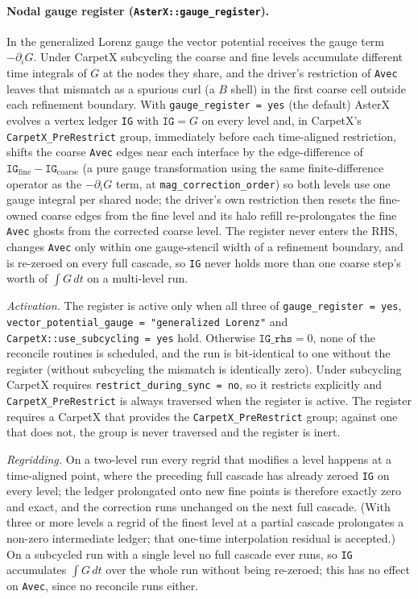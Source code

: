 \paragraph{Nodal gauge register (\texttt{AsterX::gauge\_register}).}
In the generalized Lorenz gauge the vector potential receives the gauge term
$-\partial_i G$. Under CarpetX subcycling the coarse and fine levels
accumulate different time integrals of $G$ at the nodes they share, and the
driver's restriction of \texttt{Avec} leaves that mismatch as a spurious curl
(a $B$ shell) in the first coarse cell outside each refinement boundary. With
\texttt{gauge\_register = yes} (the default) AsterX evolves a vertex ledger
\texttt{IG} with $\dot{\texttt{IG}} = G$ on every level and, in CarpetX's
\texttt{CarpetX\_PreRestrict} group, immediately before each time-aligned
restriction, shifts the coarse \texttt{Avec} edges near each interface by the
edge-difference of $\texttt{IG}_\mathrm{fine} - \texttt{IG}_\mathrm{coarse}$
(a pure gauge transformation using the same finite-difference operator as the
$-\partial_i G$ term, at \texttt{mag\_correction\_order}) so both levels use
one gauge integral per shared node; the driver's own restriction then resets
the fine-owned coarse edges from the fine level and its halo refill
re-prolongates the fine \texttt{Avec} ghosts from the corrected coarse level.
The register never enters the RHS,
changes \texttt{Avec} only within one gauge-stencil width of a refinement
boundary, and is re-zeroed on every full cascade, so \texttt{IG} never holds
more than one coarse step's worth of $\int G\,dt$ on a multi-level run.

\emph{Activation.} The register is active only when all three of
\texttt{gauge\_register = yes}, \texttt{vector\_potential\_gauge =
"generalized Lorenz"} and \texttt{CarpetX::use\_subcycling = yes} hold.
Otherwise $\texttt{IG\_rhs} = 0$, none of the reconcile routines is
scheduled, and the run is bit-identical to one without the register (without
subcycling the mismatch is identically zero). Under subcycling CarpetX
requires \texttt{restrict\_during\_sync = no}, so it restricts explicitly and
\texttt{CarpetX\_PreRestrict} is always traversed when the register is
active. The register requires a CarpetX that provides the
\texttt{CarpetX\_PreRestrict} group; against one that does not, the group is
never traversed and the register is inert.

\emph{Regridding.} On a two-level run every regrid that modifies a level
happens at a time-aligned point, where the preceding full cascade has already
zeroed \texttt{IG} on every level; the ledger prolongated onto new fine points
is therefore exactly zero and exact, and the correction runs unchanged on the
next full cascade. (With three or more levels a regrid of the finest level at
a partial cascade prolongates a non-zero intermediate ledger; that one-time
interpolation residual is accepted.) On a subcycled run with a single level no
full cascade ever runs, so \texttt{IG} accumulates $\int G\,dt$ over the whole
run without being re-zeroed; this has no effect on \texttt{Avec}, since no
reconcile runs either.

